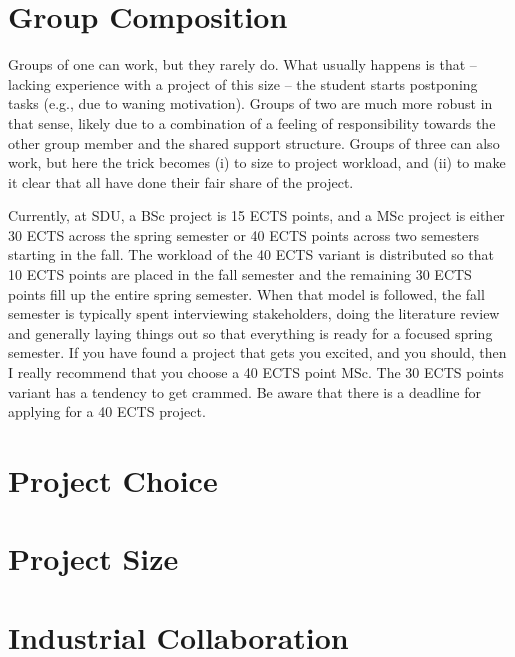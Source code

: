 \documentclass[a4paper]{memoir}
\begin{document}
\section{Group Composition}

Groups of one can work, but they rarely do. What usually happens is that -- lacking experience with a project of this size -- the student starts postponing tasks (e.g., due to waning motivation). Groups of two are much more robust in that sense, likely due to a combination of a feeling of responsibility towards the other group member and the shared support structure. Groups of three can also work, but here the trick becomes (i) to size to project workload, and (ii) to make it clear that all have done their fair share of the project.

Currently, at SDU, a BSc project is 15 ECTS points, and a MSc project is either 30 ECTS across the spring semester or 40 ECTS points across two semesters starting in the fall. The workload of the 40 ECTS variant is distributed so that 10 ECTS points are placed in the fall semester and the remaining 30 ECTS points fill up the entire spring semester. When that model is followed, the fall semester is typically spent interviewing stakeholders, doing the literature review and generally laying things out so that everything is ready for a focused spring semester. If you have found a project that gets you excited, and you should, then I really recommend that you choose a 40 ECTS point MSc. The 30 ECTS points variant has a tendency to get crammed. Be aware that there is a deadline for applying for a 40 ECTS project.


\section{Project Choice}

\section{Project Size}
\label{sec:projectsize}

\section{Industrial Collaboration}


\end{document}
